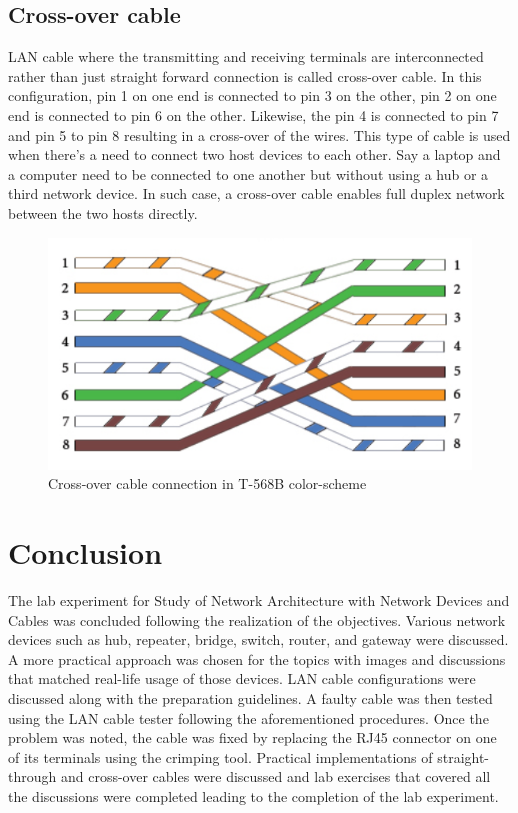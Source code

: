 \documentclass{lab_sheet}
\begin{document}
\subsection*{Cross-over cable}
LAN cable where the transmitting and receiving terminals are interconnected rather than just straight forward connection is called cross-over cable. In this configuration, pin 1 on one end is connected to pin 3 on the other, pin 2 on one end is connected to pin 6 on the other. Likewise, the pin 4 is connected to pin 7 and pin 5 to pin 8 resulting in a cross-over of the wires. This type of cable is used when there's a need to connect two host devices to each other. Say a laptop and a computer need to be connected to one another but without using a hub or a third network device. In such case, a cross-over cable enables full duplex network between the two hosts directly.
\begin{figure}[H]
    \centering
    \includegraphics{Figures/cross.png}
    \caption{Cross-over cable connection in T-568B color-scheme}
    \label{fig:straight}\end{figure}
\section{Conclusion}
The lab experiment for Study of Network Architecture with Network Devices and Cables was concluded following the realization of the objectives. Various network devices such as hub, repeater, bridge, switch, router, and gateway were discussed. A more practical approach was chosen for the topics with images and discussions that matched real-life usage of those devices. LAN cable configurations were discussed along with the preparation guidelines. A faulty cable was then tested using the LAN cable tester following the aforementioned procedures. Once the problem was noted, the cable was fixed by replacing the RJ45 connector on one of its terminals using the crimping tool. Practical implementations of straight-through and cross-over cables were discussed and lab exercises that covered all the discussions were completed leading to the completion of the lab experiment.
\end{document}
